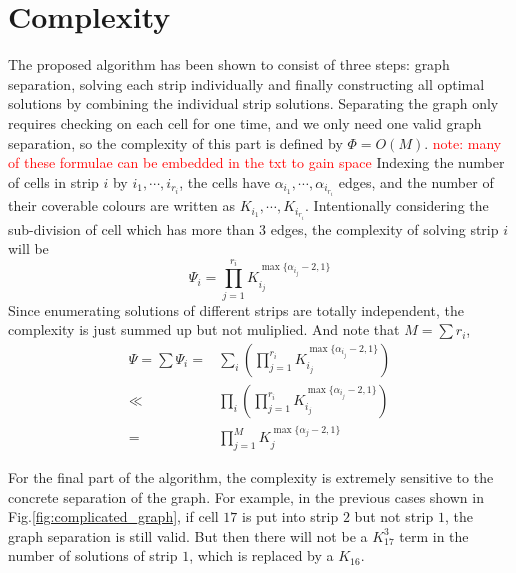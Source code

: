 \documentclass[conference]{IEEEtran}
\begin{document}
\section{Complexity}
\label{section_complexity}
The proposed algorithm has been shown to consist of three steps: graph separation, solving each strip individually and finally constructing all optimal solutions by combining the individual strip solutions. 
Separating the graph only requires checking on each cell for one time, and we only need one valid graph separation, so the complexity of this part is defined by $\Phi = O(M)$. 
\textcolor{red}{note: many of these formulae can be embedded in the txt to gain space}
Indexing the number of cells in strip $i$ by $i_1, \cdots, i_{r_i}$, the cells have $\alpha_{i_1}, \cdots, \alpha_{i_{r_i}}$ edges, and the number of their coverable colours are written as $K_{i_1}, \cdots, K_{i_{r_i}}$. 
Intentionally considering the sub-division of cell which has more than $3$ edges, the complexity of solving strip $i$ will be 
\begin{equation}
\Psi_i = \prod\limits_{j = 1}^{r_i} K_{i_j}^{\max\{\alpha_{i_j}-2, 1\}}
\end{equation}
Since enumerating solutions of different strips are totally independent, the complexity is just summed up but not muliplied. And note that $M = \sum r_i$, 
\begin{equation}
\begin{aligned}
\Psi = \sum \Psi_i = & \sum\limits_{i} \left(\prod\limits_{j = 1}^{r_i} K_{i_j}^{\max\{\alpha_{i_j}-2, 1\}}\right)\\
\ll&\prod\limits_{i}\left(\prod\limits_{j = 1}^{r_i} K_{i_j}^{\max\{\alpha_{i_j}-2, 1\}}\right)\\
=&\prod\limits_{j = 1}^M K_j^{\max\{\alpha_j -2, 1\}}
\end{aligned}
\end{equation}

For the final part of the algorithm, the complexity is extremely sensitive to the concrete separation of the graph. 
For example, in the previous cases shown in Fig.\ref{fig:complicated_graph}, if cell $17$ is put into strip $2$ but not strip $1$, the graph separation is still valid. But then there will not be a $K_{17}^3$ term in the number of solutions of strip $1$, which is replaced by a $K_{16}$. 
\end{document}
